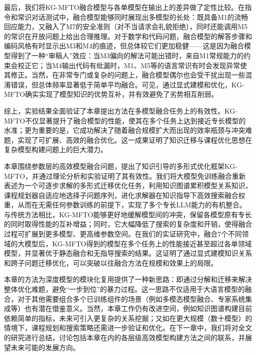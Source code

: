 \documentclass[../main.tex]{subfiles}
\begin{document}
最后，我们将KG-MFTO融合模型与各单模型在输出上的差异做了定性比较。在指令和常识对话测试中，融合模型能够同时展现出多模型的长处：既具备M1的流畅回应能力，又融入了M7的安全准则（对不当请求会礼貌拒绝），同时还能调用M5的常识在开放问题上给出合理推理。对于数学和代码问题，融合模型的解答步骤和编码风格有时显示出M3和M4的痕迹，但总体较它们更加稳健——这是因为融合模型得到了一种“审稿人”效应：当M3偏向的解法可能出错时，来自M1常规能力的约束会校正它；当M4输出代码有纰漏时，M1、M5等的语言常识有时会发现异常使其修正。当然，在非常专门或复杂的问题上，融合模型偶尔也会受干扰出现一些混淆错误，但总体频率显著低于简单平均融合。可见，通过显式建模和优化，KG-MFTO确实实现了模型知识的优势互补，并有效避免了劣势相互削弱。

综上，实验结果全面验证了本章提出方法在多模型融合任务上的有效性。KG-MFTO不仅显著提升了融合模型的性能，使其在多个任务上达到接近专长模型的水准；更为重要的是，它成功解决了随着融合规模扩大而出现的效率瓶颈与冲突难题，实现了可扩展、高效的融合优化。这一成果证明了知识迁移与课程优化思想在复杂模型构建问题上的巨大潜力。


本章围绕参数层的高效模型融合问题，提出了知识引导的多形式优化框架KG-MFTO，并通过理论分析和实验证明了其有效性。我们将大模型免训练融合重新表述为一个可逐步求解的多形式迁移优化任务，利用知识图谱累积模型关系知识，课程规划器自适应地选择子问题序列，进化求解器在知识指导下高效搜索融合权重，从而在无需任何参数训练的前提下，实现了多个专长LLM能力的有机整合。与传统方法相比，KG-MFTO能够更好地缓解模型间的冲突，保留各模型原有专长的同时取得性能的互补增益；同时，它大幅降低了搜索的复杂度和开销，使得融合过程可扩展到更多模型、更高维参数空间。在我们的实证研究中，融合7个不同领域的大模型后，KG-MFTO得到的模型在多个任务上的性能接近甚至超过各单领域模型，并显著优于静态融合和无指导搜索的结果。这证明了通过显式建模知识关系和跨子问题迁移优化，可以突破以往融合方法在规模和效果上的局限。

本章的方法为深度模型的模块化复用提供了一种新思路：即通过分解和迁移来解决整体优化难题，避免“一步到位”的暴力过程。这一思路不仅适用于大语言模型的融合，对于其他需要组合多个已训练组件的场景（例如多模态模型融合、专家系统集成等）也有潜在借鉴意义。当然，本章工作仍有改进空间，例如知识图谱构建目前依赖简单的指标，未来可引入更复杂的关系挖掘；又如在更大规模（数十模型）的情境下，课程规划和搜索策略还需进一步验证和优化。在下一章中，我们将对全文的研究进行总结，讨论包括本章在内的各层级高效模型构建方法之间的联系，并展望未来可能的发展方向。
\end{document}
